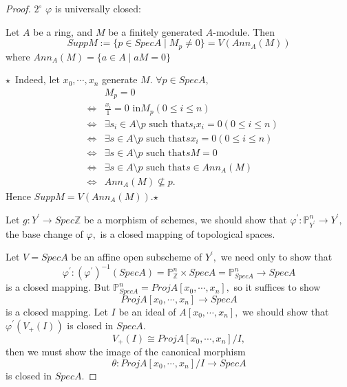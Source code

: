\begin{proof}
$\mathit{2^{\circ}}$ $\varphi$ is universally closed:

\begin{lemma}
Let $A$ be a ring, and $M$ be a finitely generated $A$-module.
Then$$SuppM:=\{p\in SpecA\mid M_p\neq 0\}=V(Ann_A(M))$$ where
$Ann_A(M)=\{a\in A\mid aM=0\}$
\end{lemma}
$\star$\ Indeed, let $x_0,\cdots,x_n$ generate $M.$ $\forall p\in
SpecA,$
\begin{eqnarray*}
& & M_p=0                                                        \\
& \Longleftrightarrow & \frac{x_i}{1}=0\text{ in
}M_p(0\leqslant i\leqslant n)                                    \\
& \Longleftrightarrow & \exists s_i\in A\setminus p\text{ such that
}s_ix_i=0(0\leqslant i\leqslant n)                               \\
& \Longleftrightarrow & \exists s\in A\setminus p\text{ such that
}sx_i=0(0\leqslant i\leqslant n)                                 \\
& \Longleftrightarrow & \exists s\in A\setminus p\text{ such that
}sM=0                                                            \\
& \Longleftrightarrow & \exists s\in A\setminus p\text{ such that
}s\in Ann_A(M)                                                   \\
& \Longleftrightarrow & Ann_A(M)\nsubseteq p.
\end{eqnarray*}
Hence $SuppM=V(Ann_A(M)).$\hspace*{\fill}$\star$

Let $g:Y^{\prime}\rightarrow Spec\mathbb{Z}$ be a morphism of
schemes, we should show that
$\varphi^{\prime}:\mathbb{P}^n_{Y^{\prime}}\rightarrow Y^{\prime},$
the base change of $\varphi,$ is a closed mapping of topological
spaces.

Let $V=SpecA$ be an affine open subscheme of $Y^{\prime},$ we need
only to show that
$$\varphi^{\prime}:(\varphi^{\prime})^{-1}(SpecA)=\mathbb{P}^n_{\mathbb{Z}}\times SpecA=\mathbb{P}^n_{SpecA}\rightarrow SpecA$$
is a closed mapping. But
$\mathbb{P}^n_{SpecA}=ProjA[x_0,\cdots,x_n],$ so it suffices to show
$$ProjA[x_0,\cdots,x_n]\rightarrow SpecA$$
is a closed mapping. Let $I$ be an ideal of $A[x_0,\cdots,x_n],$ we
should show that $\varphi^{\prime}(V_+(I))$ is closed in $SpecA.$
$$V_+(I)\cong ProjA[x_0,\cdots,x_n]/I,$$ then we must show the image
of the canonical morphism
$$\theta:ProjA[x_0,\cdots,x_n]/I\rightarrow SpecA$$
is closed in $SpecA.$


\end{proof}
